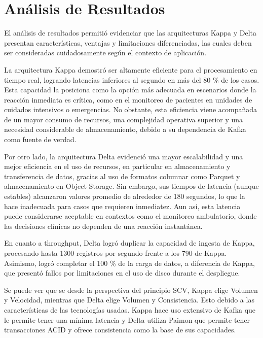 \section{Análisis de Resultados}

El análisis de resultados permitió evidenciar que las arquitecturas Kappa y Delta presentan características, 
ventajas y limitaciones diferenciadas, las cuales deben ser consideradas cuidadosamente según el contexto de aplicación. \newline

La arquitectura Kappa demostró ser altamente eficiente para el procesamiento en tiempo real, logrando latencias inferiores al segundo en más del 80 \% de los casos. 
Esta capacidad la posiciona como la opción más adecuada en escenarios donde la reacción inmediata es crítica, 
como en el monitoreo de pacientes en unidades de cuidados intensivos o emergencias. 
No obstante, esta eficiencia viene acompañada de un mayor consumo de recursos, 
una complejidad operativa superior y una necesidad considerable de almacenamiento, 
debido a su dependencia de Kafka como fuente de verdad. \newline

Por otro lado, la arquitectura Delta evidenció una mayor escalabilidad y una mejor eficiencia en el uso de recursos, 
en particular en almacenamiento y transferencia de datos, gracias al uso de formatos columnar como Parquet y almacenamiento en Object Storage. 
Sin embargo, sus tiempos de latencia (aunque estables) alcanzaron valores promedio de alrededor de 180 segundos, 
lo que la hace inadecuada para casos que requieren inmediatez. Aun así, esta latencia puede considerarse aceptable en contextos como el monitoreo ambulatorio, 
donde las decisiones clínicas no dependen de una reacción instantánea. \newline

En cuanto a throughput, Delta logró duplicar la capacidad de ingesta de Kappa, 
procesando hasta 1300 registros por segundo frente a los 790 de Kappa. 
Asimismo, logró completar el 100 \% de la carga de datos, a diferencia de Kappa, 
que presentó fallos por limitaciones en el uso de disco durante el despliegue. \newline

Se puede ver que se desde la perspectiva del principio SCV, Kappa elige Volumen y Velocidad,
mientras que Delta elige Volumen y Consistencia. Esto debido a las características de las tecnologías usadas. 
Kappa hace uso extensivo de Kafka que le permite tener una mínima latencia 
y Delta utiliza Paimon que permite tener transacciones ACID y ofrece consistencia como la base de sus capacidades.

